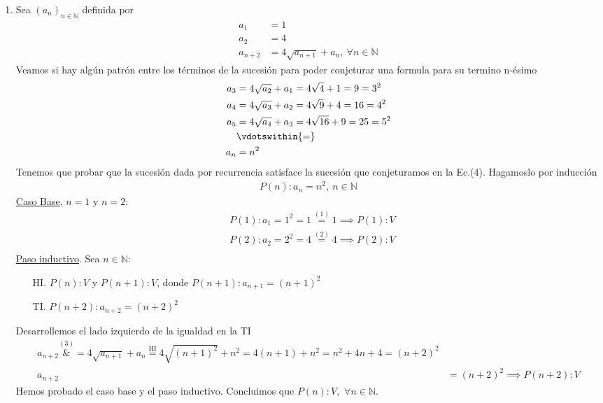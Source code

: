 \begin{enumerate}[label=\roman*)]
    \item Sea $(a_n)_{n \in \mathbb{N}}$ definida por
    \setcounter{equation}{0}
    \begin{align}
        a_1 &= 1 \\
        a_2 &= 4 \\
        a_{n+2} &= 4 \sqrt{a_{n+1}} + a_n,\ \forall n \in \mathbb{N}
    \end{align}
    Veamos si hay algún patrón entre los términos de la sucesión para poder conjeturar una formula para su termino 
    n-ésimo
    \begin{align}
        a_3 &= 4 \sqrt{a_2} + a_1 = 4 \sqrt{4} + 1 = 9 = 3^2 \nonumber \\
        a_4 &= 4 \sqrt{a_3} + a_2 = 4 \sqrt{9} + 4 = 16 = 4^2 \nonumber \\
        a_5 &= 4 \sqrt{a_4} + a_3 = 4 \sqrt{16} + 9 = 25 = 5^2 \nonumber \\
        &\vdotswithin{=} \nonumber \\
        a_n &= n^2
    \end{align}
    Tenemos que probar que la sucesión dada por recurrencia satisface la sucesión que conjeturamos en la Ec.(4). 
    Hagamoslo por inducción
    \begin{align*}
        P(n): a_n = n^2, \ n \in \mathbb{N}   
    \end{align*}
    \underline{Caso Base}, $n = 1$ y $n = 2$:
	\begin{align*}
		&P(1): a_1 = 1^2 = 1 \overset{(1)}{=} 1 \implies P(1):V \\
        &P(2): a_2 = 2^2 = 4 \overset{(2)}{=} 4 \implies P(2):V \\
	\end{align*}
	\underline{Paso inductivo}. Sea $n \in \mathbb{N}$:
	\begin{enumerate}
        \item[HI.] $P(n):V \text{ y } P(n+1):V$, donde $P(n+1): a_{n+1} = (n+1)^2$
        \item[TI.] $P(n+2): a_{n+2} = (n+2)^2$
    \end{enumerate}
 	Desarrollemos el lado izquierdo de la igualdad en la TI
    \begin{align*}
  	    a_{n+2} \overset{(3)}&{=} 4 \sqrt{a_{n+1}} + a_n \overset{\text{HI}}{=} 4 \sqrt{(n+1)^2} + n^2  
        = 4(n+1) + n^2 = n^2 + 4n + 4 = (n+2)^2 \\
        a_{n+2} &= (n+2)^2 \implies P(n+2):V
    \end{align*}
    Hemos probado el caso base y el paso inductivo. Concluimos que $P(n):V,$ $\forall n \in \mathbb{N}$.


\end{enumerate}
